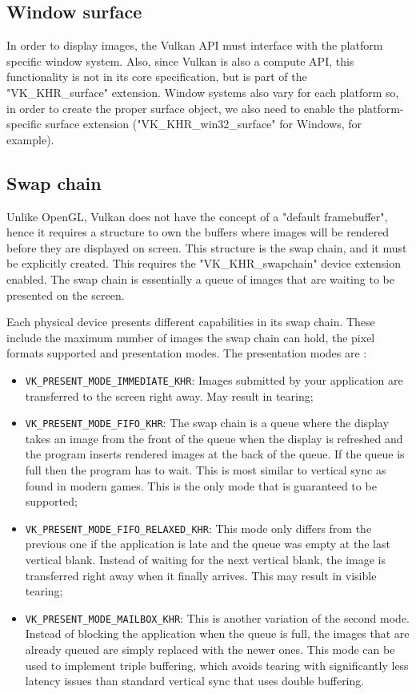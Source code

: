 \subsection{Window surface}
In order to display images, the Vulkan API must interface with the platform specific window system. Also, since Vulkan is also a compute API, this functionality is not in its core specification, but is part of the "VK\_KHR\_surface" extension. Window systems also vary for each platform so, in order to create the proper surface object, we also need to enable the platform-specific surface extension ("VK\_KHR\_win32\_surface" for Windows, for example).

\subsection{Swap chain}
Unlike OpenGL, Vulkan does not have the concept of a "default framebuffer", hence it requires a structure to own the buffers where images will be rendered before they are displayed on screen. This structure is the swap chain, and it must be explicitly created. This requires the "VK\_KHR\_swapchain" device extension enabled. The swap chain is essentially a queue of images that are waiting to be presented on the screen.

Each physical device presents different capabilities in its swap chain. These include the maximum number of images the swap chain can hold, the pixel formats supported and presentation modes. The presentation modes are \cite{vulkan_tutorial}:
\begin{itemize}
    \item \texttt{VK\_PRESENT\_MODE\_IMMEDIATE\_KHR}: Images submitted by your application are transferred to the screen right away. May result in tearing;
    \item \texttt{VK\_PRESENT\_MODE\_FIFO\_KHR}: The swap chain is a queue where the display takes an image from the front of the queue when the display is refreshed and the program inserts rendered images at the back of the queue. If the queue is full then the program has to wait. This is most similar to vertical sync as found in modern games. This is the only mode that is guaranteed to be supported;
    \item \texttt{VK\_PRESENT\_MODE\_FIFO\_RELAXED\_KHR}: This mode only differs from the previous one if the application is late and the queue was empty at the last vertical blank. Instead of waiting for the next vertical blank, the image is transferred right away when it finally arrives. This may result in visible tearing;
    \item \texttt{VK\_PRESENT\_MODE\_MAILBOX\_KHR}: This is another variation of the second mode. Instead of blocking the application when the queue is full, the images that are already queued are simply replaced with the newer ones. This mode can be used to implement triple buffering, which avoids tearing with significantly less latency issues than standard vertical sync that uses double buffering.
\end{itemize}

